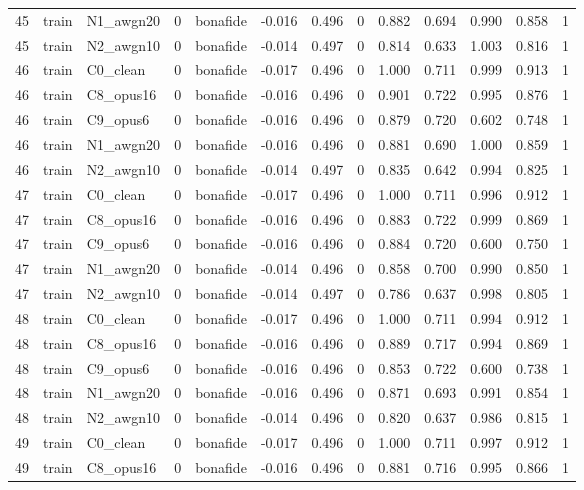 \begin{tabular}{rllrlrrrrrrrr}
45 & train & N1_awgn20 & 0 & bonafide & -0.016 & 0.496 & 0 & 0.882 & 0.694 & 0.990 & 0.858 & 1 \\
45 & train & N2_awgn10 & 0 & bonafide & -0.014 & 0.497 & 0 & 0.814 & 0.633 & 1.003 & 0.816 & 1 \\
46 & train & C0_clean & 0 & bonafide & -0.017 & 0.496 & 0 & 1.000 & 0.711 & 0.999 & 0.913 & 1 \\
46 & train & C8_opus16 & 0 & bonafide & -0.016 & 0.496 & 0 & 0.901 & 0.722 & 0.995 & 0.876 & 1 \\
46 & train & C9_opus6 & 0 & bonafide & -0.016 & 0.496 & 0 & 0.879 & 0.720 & 0.602 & 0.748 & 1 \\
46 & train & N1_awgn20 & 0 & bonafide & -0.016 & 0.496 & 0 & 0.881 & 0.690 & 1.000 & 0.859 & 1 \\
46 & train & N2_awgn10 & 0 & bonafide & -0.014 & 0.497 & 0 & 0.835 & 0.642 & 0.994 & 0.825 & 1 \\
47 & train & C0_clean & 0 & bonafide & -0.017 & 0.496 & 0 & 1.000 & 0.711 & 0.996 & 0.912 & 1 \\
47 & train & C8_opus16 & 0 & bonafide & -0.016 & 0.496 & 0 & 0.883 & 0.722 & 0.999 & 0.869 & 1 \\
47 & train & C9_opus6 & 0 & bonafide & -0.016 & 0.496 & 0 & 0.884 & 0.720 & 0.600 & 0.750 & 1 \\
47 & train & N1_awgn20 & 0 & bonafide & -0.014 & 0.496 & 0 & 0.858 & 0.700 & 0.990 & 0.850 & 1 \\
47 & train & N2_awgn10 & 0 & bonafide & -0.014 & 0.497 & 0 & 0.786 & 0.637 & 0.998 & 0.805 & 1 \\
48 & train & C0_clean & 0 & bonafide & -0.017 & 0.496 & 0 & 1.000 & 0.711 & 0.994 & 0.912 & 1 \\
48 & train & C8_opus16 & 0 & bonafide & -0.016 & 0.496 & 0 & 0.889 & 0.717 & 0.994 & 0.869 & 1 \\
48 & train & C9_opus6 & 0 & bonafide & -0.016 & 0.496 & 0 & 0.853 & 0.722 & 0.600 & 0.738 & 1 \\
48 & train & N1_awgn20 & 0 & bonafide & -0.016 & 0.496 & 0 & 0.871 & 0.693 & 0.991 & 0.854 & 1 \\
48 & train & N2_awgn10 & 0 & bonafide & -0.014 & 0.496 & 0 & 0.820 & 0.637 & 0.986 & 0.815 & 1 \\
49 & train & C0_clean & 0 & bonafide & -0.017 & 0.496 & 0 & 1.000 & 0.711 & 0.997 & 0.912 & 1 \\
49 & train & C8_opus16 & 0 & bonafide & -0.016 & 0.496 & 0 & 0.881 & 0.716 & 0.995 & 0.866 & 1 \\

\end{tabular}
